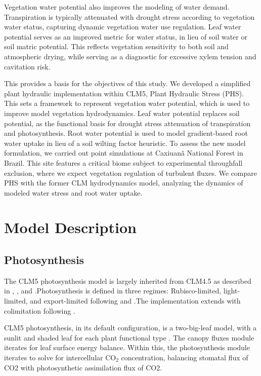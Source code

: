 \documentclass[draft,linenumbers]{agujournal}
\begin{document}
Vegetation water potential also improves the modeling of water demand.
Transpiration is typically attenuated with drought stress according to vegetation water status, capturing dynamic vegetation water use regulation.
Leaf water potential serves as an improved metric for water status, in lieu of soil water or soil matric potential.
This reflects vegetation sensitivity to both soil and atmospheric drying, while serving as a diagnostic for excessive xylem tension and cavitation risk.

This provides a basis for the objectives of this study.
We developed a simplified plant hydraulic implementation within CLM5, Plant Hydraulic Stress (PHS).
This sets a framework to represent vegetation water potential, which is used to improve model vegetation hydrodynamics.
Leaf water potential replaces soil potential, as the functional basis for drought stress attenuation of transpiration and photosynthesis.
Root water potential is used to model gradient-based root water uptake in lieu of a soil wilting factor heuristic.
To assess the new model formulation, we carried out point simulations at Caxiuan\~a National Forest in Brazil.
This site features a critical biome subject to experimental throughfall exclusion, where we expect vegetation regulation of turbulent fluxes.
We compare PHS with the former CLM hydrodynamics model, analyzing the dynamics of modeled water stress and root water uptake.

\section{Model Description}

\subsection{Photosynthesis}
\label{sect:A}
    The CLM5 photosynthesis model is largely inherited from CLM4.5 as described in \citet{bonan2011}, \citet{thornton2007},
    and \citet{oleson2013}.Photosynthesis is defined in three regimes: Rubisco-limited, light-limited, and export-limited 
    following \citet{farquhar1980} and \citet{harley1992}.The implementation extends \citet{sellers1996a,sellers1996b} with 
    colimitation following \citet{collatz1991}. 
    
    CLM5 photosynthesis, in its default configuration, is a two-big-leaf model, with a sunlit and shaded leaf for each plant functional type \citep{thornton2007, dai2004, oleson2013}. 
    The canopy fluxes module iterates for leaf surface energy balance.
    Within this, the photosynthesis module iterates to solve for intercellular CO$_2$ concentration, balancing stomatal flux of 
    CO2 with photosynthetic assimilation flux of CO2.
    
\end{document}
